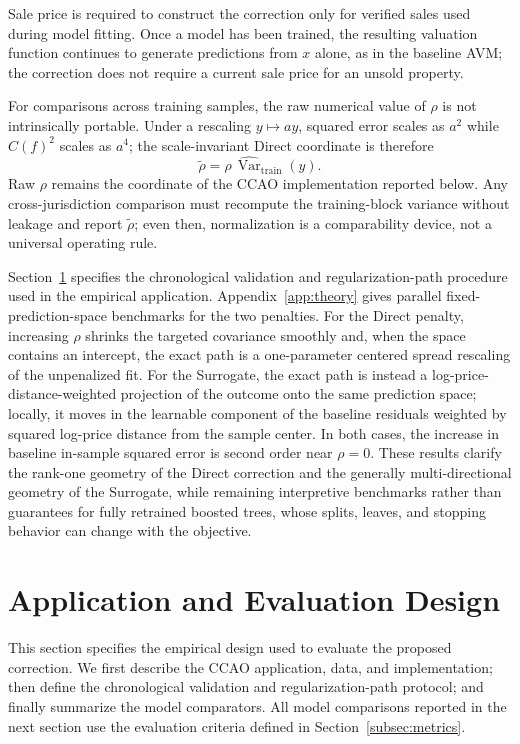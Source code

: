 \documentclass[10pt]{article}
\theoremstyle{definition}
\newcommand{\Var}{\operatorname{Var}}
\newcommand{\1}{\mathbf{1}}
\begin{document}
{Sale price is required to construct the correction only for verified sales used during model fitting. Once a model has been trained, the resulting valuation function continues to generate predictions from $x$ alone, as in the baseline AVM; the correction does not require a current sale price for an unsold property.}

For comparisons across training samples, the raw numerical value of $\rho$ is not intrinsically portable. Under a rescaling $y\mapsto ay$, squared error scales as $a^2$ while $C(f)^2$ scales as $a^4$; the scale-invariant Direct coordinate is therefore
\begin{equation}
\label{eq:normalized_rho}
\widetilde\rho=\rho\,\widehat{\Var}_{\mathrm{train}}(y).
\end{equation}
Raw $\rho$ remains the coordinate of the CCAO implementation reported below. Any cross-jurisdiction comparison must recompute the training-block variance without leakage and report $\widetilde\rho$; even then, normalization is a comparability device, not a universal operating rule.

Section~\ref{sec:empirical_design} specifies the chronological validation and regularization-path procedure used in the empirical application. Appendix~\ref{app:theory} gives parallel fixed-prediction-space benchmarks for the two penalties. For the Direct penalty, increasing $\rho$ shrinks the targeted covariance smoothly and, when the space contains an intercept, the exact path is a one-parameter centered spread rescaling of the unpenalized fit. For the Surrogate, the exact path is instead a log-price-distance-weighted projection of the outcome onto the same prediction space; locally, it moves in the learnable component of the baseline residuals weighted by squared log-price distance from the sample center. In both cases, the increase in baseline in-sample squared error is second order near $\rho=0$. These results clarify the rank-one geometry of the Direct correction and the generally multi-directional geometry of the Surrogate, while remaining interpretive benchmarks rather than guarantees for fully retrained boosted trees, whose splits, leaves, and stopping behavior can change with the objective.


\section{Application and Evaluation Design}
\label{sec:empirical_design}

{This section specifies the empirical design used to evaluate the proposed correction. We first describe the CCAO application, data, and implementation; then define the chronological validation and regularization-path protocol; and finally summarize the model comparators. All model comparisons reported in the next section use the evaluation criteria defined in Section~\ref{subsec:metrics}.}
\end{document}
